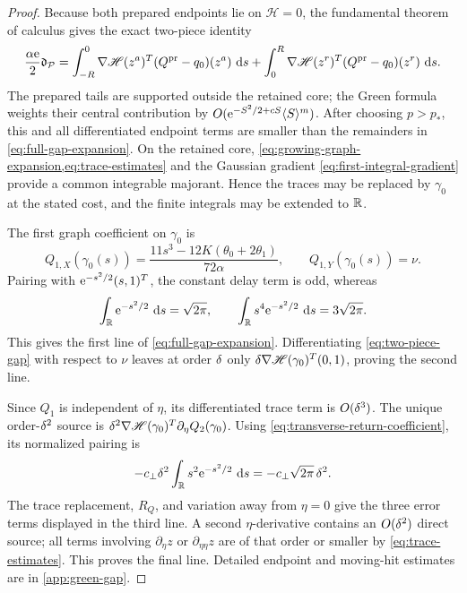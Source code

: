 \begin{proof}
Because both prepared endpoints lie on \(\mathscr H=0\), the fundamental
theorem of calculus gives the exact two-piece identity
\begin{equation}
\label{eq:two-piece-gap}
 \frac{\alpha\mathrm e}{2}\mathfrak d_\mathcal P
 =\int_{-R}^{0}\nabla\mathscr H(z^a)^T
       (Q^{\rm pr}-q_0)(z^a)\,\,\mathrm d s
  +\int_{0}^{R}\nabla\mathscr H(z^r)^T
       (Q^{\rm pr}-q_0)(z^r)\,\,\mathrm d s.
\end{equation}
The prepared tails are supported outside the retained core; the Green
formula weights their central contribution by
\(O(\mathrm e^{-S^2/2+cS}\langle S\rangle^m)\).  After choosing \(p>p_*\), this
and all differentiated endpoint terms are smaller than the remainders in
\cref{eq:full-gap-expansion}.  On the retained core,
\cref{eq:growing-graph-expansion,eq:trace-estimates} and the Gaussian
gradient \cref{eq:first-integral-gradient} provide a common integrable
majorant.  Hence the traces may be replaced by \(\gamma_0\) at the stated
cost, and the finite integrals may be extended to \(\mathbb R\).

The first graph coefficient on \(\gamma_0\) is
\begin{equation}
\label{eq:Q1-on-canard}
 Q_{1,X}(\gamma_0(s))
 =\frac{11s^3-12K(\theta_0+2\theta_1)}{72\alpha},
 \qquad Q_{1,Y}(\gamma_0(s))=\nu.
\end{equation}
Pairing with \(\mathrm e^{-s^2/2}(s,1)^T\), the constant delay term is odd,
whereas
\[
 \int_\mathbb R\mathrm e^{-s^2/2}\,\,\mathrm d s=\sqrt{2\pi},
 \qquad
 \int_\mathbb R s^4\mathrm e^{-s^2/2}\,\,\mathrm d s=3\sqrt{2\pi}.
\]
This gives the first line of \cref{eq:full-gap-expansion}.  Differentiating
\cref{eq:two-piece-gap} with respect to \(\nu\) leaves at order \(\delta\)
only
\(\delta\nabla\mathscr H(\gamma_0)^T(0,1)\), proving the second line.

Since \(Q_1\) is independent of \(\eta\), its differentiated trace term is
\(O(\delta^3)\).  The unique order-\(\delta^2\) source is
\(
 \delta^2\nabla\mathscr H(\gamma_0)^T\partial_\eta Q_2(\gamma_0)
\).
Using \cref{eq:transverse-return-coefficient}, its normalized pairing is
\begin{equation}
 -c_\perp\delta^2\int_\mathbb R s^2\mathrm e^{-s^2/2}\,\,\mathrm d s
 =-c_\perp\sqrt{2\pi}\,\delta^2.
\end{equation}
The trace replacement, \(R_Q\), and variation away from \(\eta=0\) give
the three error terms displayed in the third line.  A second
\(\eta\)-derivative contains an \(O(\delta^2)\) direct source; all terms
involving \(\partial_\eta z\) or
\(\partial_{\eta\eta}z\) are of that order or smaller by
\cref{eq:trace-estimates}.  This proves the final line.  Detailed endpoint
and moving-hit estimates are in \cref{app:green-gap}.
\end{proof}


